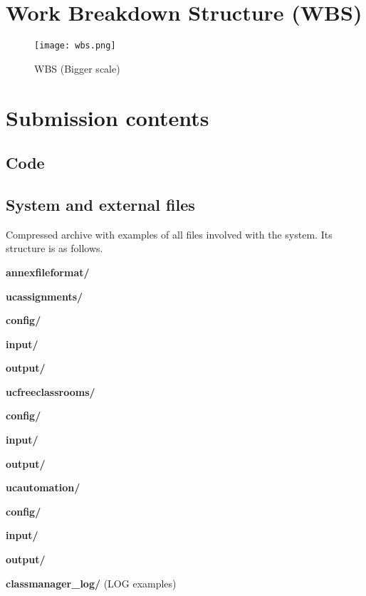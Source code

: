 \section{Work Breakdown Structure (WBS)}


\begin{figure}[H]
    \caption{WBS (Bigger scale)}
  \centering
  \texttt{[image: wbs.png]}
\end{figure}



\section{Submission contents}

\subsection{Code}



\subsection{System and external files}\label{annex-file-format}

Compressed archive with examples of all files involved with the system. Its structure is as follows.

\begin{description}
    \item \textbf{annexfileformat/}
        \begin{description}
            \item \textbf{ucassignments/}
                \begin{description}
                    \item \textbf{config/}
                    \item \textbf{input/}
                    \item \textbf{output/}
                \end{description}
            \item \textbf{ucfreeclassrooms/}
                \begin{description}
                    \item \textbf{config/}
                    \item \textbf{input/}
                    \item \textbf{output/}
                \end{description}
            \item \textbf{ucautomation/}
                \begin{description}
                    \item \textbf{config/}
                    \item \textbf{input/}
                    \item \textbf{output/}
                \end{description}
            \item \textbf{classmanager\_log/} (LOG examples)
        \end{description}
\end{description}

